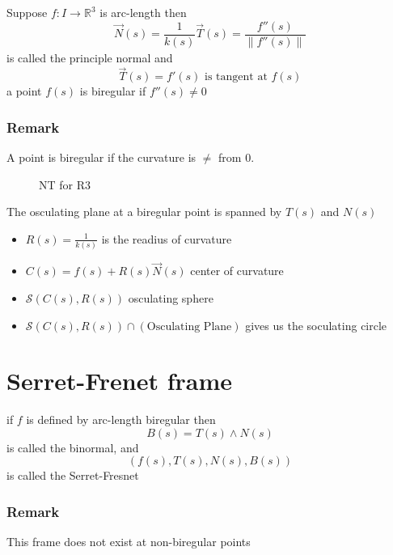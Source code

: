 \begin{defn}[]
    Suppose $ f: I \to \mathbb{R}^3 $ is arc-length then 
    \[
        \vec{N}(s) = \frac{ 1 }{ k(s)  } \vec{T}(s) = \frac{ f''(s)  }{ \| f''(s) \|^{ }_{ }  }     
    \]
    is called the principle normal and 
    \[
        \vec{T}(s) = f'(s) \text{ is tangent at } f(s)
    \]
    a point $ f(s)  $ is biregular if $ f''(s) \neq 0 $
    \label{def:}
\end{defn}
\subsubsection{Remark}
A point is biregular if the curvature is $ \neq  $ from 0. 

\begin{figure}[ht]
    \centering
    \caption{NT for R3}
    \label{fig:nt-for-r3}
\end{figure}




\begin{defn}
    The osculating plane at a biregular point is spanned by $ T(s) $ and $ N(s) $
    \label{def:Osculating Plane}
    \begin{itemize}
        \item $ R(s)  = \frac{ 1 }{ k(s) } $ is the readius of curvature 
        \item $ C(s) = f(s) + R(s)\vec{N}(s)  $ center of curvature 
        \item $ \mathscr{ S } \left( C(s), R(s) \right)  $ osculating sphere 
        \item $ \mathscr{ S } \left( C(s), R(s) \right) \cap \left( \text{Osculating
            Plane} \right)  $ gives us the soculating circle
    \end{itemize} 
\end{defn}

\section{Serret-Frenet frame}
\label{sec:Serret-Frenet frame}
\begin{defn}
    if $ f $ is defined by arc-length biregular then 
    \[
        B(s) = T(s) \wedge N(s) 
    \]
    is called the binormal, and 
    \[
        \left( f(s), T(s), N(s) , B(s) \right) 
    \] is called the Serret-Fresnet 
    \label{def:Serret-Fresnet Frame}
\end{defn}
\subsubsection{Remark}
This frame does not exist at non-biregular points


